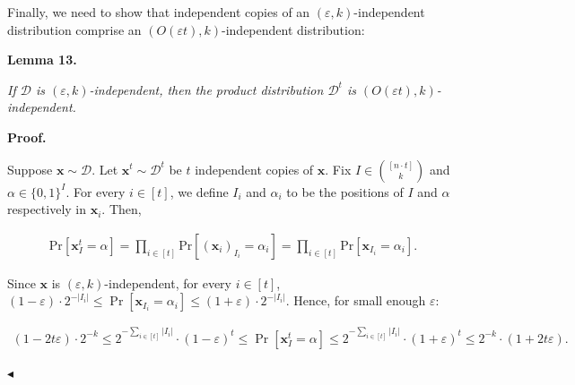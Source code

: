 \documentclass[10pt,a4paper]{article}
\begin{document}
Finally, we need to show that independent copies of an $(\varepsilon,k)$-independent distribution comprise an $(O(\varepsilon t),k)$-independent distribution:\par





\par\medskip\noindent\textbf{
\textbf{Lemma 13}\textbf{.}
}\par



\emph{If $\mathcal{D}$ is $(\varepsilon,k)$-independent, then the product distribution $\mathcal{D}^{t}$ is $(O(\varepsilon t),k)$-independent.}\par







\par\medskip\noindent\textbf{Proof.}\par




Suppose $\bm{x}\sim\mathcal{D}$. Let $\bm{x}^{t}\sim\mathcal{D}^{t}$ be $t$ independent copies of $\bm{x}$. Fix $I\in\binom{[n\cdot t]}{k}$ and $\alpha\in\{0,1\}^{I}$. For every $i\in[t]$, we define $I_{i}$ and $\alpha_{i}$ to be the positions of $I$ and $\alpha$ respectively in $\bm{x}_{i}$. Then,\par


\[\begin{gathered}
\mathrm{Pr}[\bm{x}^{t}_{I}=\alpha]=\prod_{i\in[t]}\mathrm{Pr}[(\bm{x}_{i})_{I_{i}}=\alpha_{i}]=\prod_{i\in[t]}\mathrm{Pr}[\bm{x}_{I_{i}}=\alpha_{i}].
\end{gathered}\]


Since $\bm{x}$ is $(\varepsilon,k)$-independent, for every $i\in[t]$,
$(1-\varepsilon)\cdot 2^{-|I_{i}|}\leq\Pr[\bm{x}_{I_{i}}=\alpha_{i}]\leq(1+\varepsilon)\cdot 2^{-|I_{i}|}$. Hence, for small enough $\varepsilon$:\par


\[\begin{gathered}
(1-2t\varepsilon)\cdot 2^{-k}\leq 2^{-\sum_{i\in[t]}|I_{i}|}\cdot(1-\varepsilon)^{t}\leq\Pr[\bm{x}^{t}_{I}=\alpha]\leq 2^{-\sum_{i\in[t]}|I_{i}|}\cdot(1+\varepsilon)^{t}\leq 2^{-k}\cdot(1+2t\varepsilon).\
\end{gathered}\]


$\blacktriangleleft$\par
\end{document}
